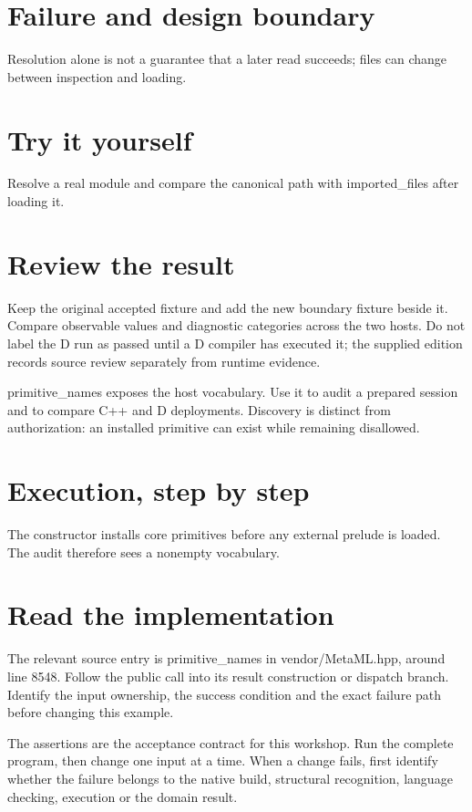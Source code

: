 
\section*{Failure and design boundary}
Resolution alone is not a guarantee that a later read succeeds; files can change between inspection and loading.

\section*{Try it yourself}
Resolve a real module and compare the canonical path with imported\_files after loading it.

\section*{Review the result}
Keep the original accepted fixture and add the new boundary fixture beside it. Compare observable values and diagnostic categories across the two hosts. Do not label the D run as passed until a D compiler has executed it; the supplied edition records source review separately from runtime evidence.

\clearpage
{}
primitive\_names exposes the host vocabulary. Use it to audit a prepared session and to compare C++ and D deployments. Discovery is distinct from authorization: an installed primitive can exist while remaining disallowed.


\section*{Execution, step by step}
The constructor installs core primitives before any external prelude is loaded. The audit therefore sees a nonempty vocabulary.

\section*{Read the implementation}
The relevant source entry is primitive\_names in vendor/MetaML.hpp, around line 8548. Follow the public call into its result construction or dispatch branch. Identify the input ownership, the success condition and the exact failure path before changing this example.

The assertions are the acceptance contract for this workshop. Run the complete program, then change one input at a time. When a change fails, first identify whether the failure belongs to the native build, structural recognition, language checking, execution or the domain result.

